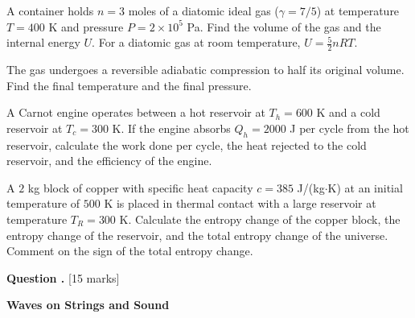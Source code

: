 \documentclass[12pt,a4paper]{article}
\newcounter{questioncounter}
\newcommand{\question}[1]{%
  \stepcounter{questioncounter}%
  \vspace{0.5cm}%
  \noindent\textbf{Question \thequestioncounter.} \hfill [#1 marks]%
  \vspace{0.2cm}%
  \par%
}
\begin{document}
\begin{parts}
\item A container holds $n = 3$ moles of a diatomic ideal gas ($\gamma = 7/5$) at temperature $T = 400$ K and pressure $P = 2 \times 10^5$ Pa. Find the volume of the gas and the internal energy $U$. For a diatomic gas at room temperature, $U = \frac{5}{2}nRT$. 

\item The gas undergoes a reversible adiabatic compression to half its original volume. Find the final temperature and the final pressure. 

\item A Carnot engine operates between a hot reservoir at $T_h = 600$ K and a cold reservoir at $T_c = 300$ K. If the engine absorbs $Q_h = 2000$ J per cycle from the hot reservoir, calculate the work done per cycle, the heat rejected to the cold reservoir, and the efficiency of the engine. 

\item A $2$ kg block of copper with specific heat capacity $c = 385$ J/(kg$\cdot$K) at an initial temperature of $500$ K is placed in thermal contact with a large reservoir at temperature $T_R = 300$ K. Calculate the entropy change of the copper block, the entropy change of the reservoir, and the total entropy change of the universe. Comment on the sign of the total entropy change. 
\end{parts}

\newpage

\question{15}

\noindent\textbf{Waves on Strings and Sound}
\end{document}
